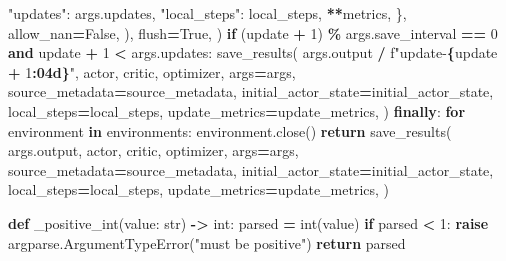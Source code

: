 \documentclass[
  chinese,
  11pt,
  letterpaper,
]{article}
\newenvironment{Shaded}{\begin{snugshade}}{\end{snugshade}}
\newcommand{\BuiltInTok}[1]{#1}
\newcommand{\ControlFlowTok}[1]{\textcolor[rgb]{0.13,0.29,0.53}{\textbf{#1}}}
\newcommand{\DecValTok}[1]{\textcolor[rgb]{0.00,0.00,0.81}{#1}}
\newcommand{\KeywordTok}[1]{\textcolor[rgb]{0.13,0.29,0.53}{\textbf{#1}}}
\newcommand{\NormalTok}[1]{#1}
\newcommand{\OperatorTok}[1]{\textcolor[rgb]{0.81,0.36,0.00}{\textbf{#1}}}
\newcommand{\SpecialCharTok}[1]{\textcolor[rgb]{0.81,0.36,0.00}{\textbf{#1}}}
\newcommand{\SpecialStringTok}[1]{\textcolor[rgb]{0.31,0.60,0.02}{#1}}
\newcommand{\StringTok}[1]{\textcolor[rgb]{0.31,0.60,0.02}{#1}}
\newcommand{\VariableTok}[1]{\textcolor[rgb]{0.00,0.00,0.00}{#1}}
\renewenvironment{Shaded}{\par\smallskip}{\par\smallskip}
\begin{document}
\begin{Shaded}
\begin{Highlighting}[]
                        \StringTok{"updates"}\NormalTok{: args.updates,}
                        \StringTok{"local\_steps"}\NormalTok{: local\_steps,}
                        \OperatorTok{**}\NormalTok{metrics,}
\NormalTok{                    \},}
\NormalTok{                    allow\_nan}\OperatorTok{=}\VariableTok{False}\NormalTok{,}
\NormalTok{                ),}
\NormalTok{                flush}\OperatorTok{=}\VariableTok{True}\NormalTok{,}
\NormalTok{            )}
            \ControlFlowTok{if}\NormalTok{ (update }\OperatorTok{+} \DecValTok{1}\NormalTok{) }\OperatorTok{\%}\NormalTok{ args.save\_interval }\OperatorTok{==} \DecValTok{0} \KeywordTok{and}\NormalTok{ update }\OperatorTok{+} \DecValTok{1} \OperatorTok{\textless{}}\NormalTok{ args.updates:}
\NormalTok{                save\_results(}
\NormalTok{                    args.output }\OperatorTok{/} \SpecialStringTok{f"update{-}}\SpecialCharTok{\{}\NormalTok{update }\OperatorTok{+} \DecValTok{1}\SpecialCharTok{:04d\}}\SpecialStringTok{"}\NormalTok{, actor, critic, optimizer,}
\NormalTok{                    args}\OperatorTok{=}\NormalTok{args, source\_metadata}\OperatorTok{=}\NormalTok{source\_metadata,}
\NormalTok{                    initial\_actor\_state}\OperatorTok{=}\NormalTok{initial\_actor\_state,}
\NormalTok{                    local\_steps}\OperatorTok{=}\NormalTok{local\_steps, update\_metrics}\OperatorTok{=}\NormalTok{update\_metrics,}
\NormalTok{                )}
    \ControlFlowTok{finally}\NormalTok{:}
        \ControlFlowTok{for}\NormalTok{ environment }\KeywordTok{in}\NormalTok{ environments:}
\NormalTok{            environment.close()}
    \ControlFlowTok{return}\NormalTok{ save\_results(}
\NormalTok{        args.output,}
\NormalTok{        actor,}
\NormalTok{        critic,}
\NormalTok{        optimizer,}
\NormalTok{        args}\OperatorTok{=}\NormalTok{args,}
\NormalTok{        source\_metadata}\OperatorTok{=}\NormalTok{source\_metadata,}
\NormalTok{        initial\_actor\_state}\OperatorTok{=}\NormalTok{initial\_actor\_state,}
\NormalTok{        local\_steps}\OperatorTok{=}\NormalTok{local\_steps,}
\NormalTok{        update\_metrics}\OperatorTok{=}\NormalTok{update\_metrics,}
\NormalTok{    )}


\KeywordTok{def}\NormalTok{ \_positive\_int(value: }\BuiltInTok{str}\NormalTok{) }\OperatorTok{{-}\textgreater{}} \BuiltInTok{int}\NormalTok{:}
\NormalTok{    parsed }\OperatorTok{=} \BuiltInTok{int}\NormalTok{(value)}
    \ControlFlowTok{if}\NormalTok{ parsed }\OperatorTok{\textless{}} \DecValTok{1}\NormalTok{:}
        \ControlFlowTok{raise}\NormalTok{ argparse.ArgumentTypeError(}\StringTok{"must be positive"}\NormalTok{)}
    \ControlFlowTok{return}\NormalTok{ parsed}



\end{Highlighting}
\end{Shaded}
\end{document}
